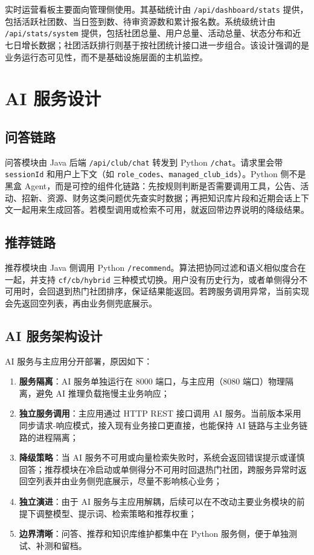 实时运营看板主要面向管理侧使用。其基础统计由 \texttt{/api/dashboard/}\allowbreak\texttt{stats} 提供，包括活跃社团数、当日签到数、待审资源数和累计报名数。系统级统计由 \texttt{/api/stats/}\allowbreak\texttt{system} 提供，包括社团总量、用户总量、活动总量、状态分布和近七日增长数据；社团活跃排行则基于按社团统计接口进一步组合。该设计强调的是业务运行态可见性，而不是基础设施层面的主机监控。

\section{AI 服务设计}

\subsection{问答链路}

问答模块由 Java 后端 \texttt{/api/club/chat} 转发到 Python \texttt{/chat}。请求里会带 \texttt{sessionId} 和用户上下文（如 \texttt{role\_codes}、\texttt{managed\_club\_ids}）。Python 侧不是黑盒 Agent，而是可控的组件化链路：先按规则判断是否需要调用工具，公告、活动、招新、资源、财务这类问题优先查实时数据；再把知识库片段和近期会话上下文一起用来生成回答。若模型调用或检索不可用，就返回带边界说明的降级结果。

\subsection{推荐链路}

推荐模块由 Java 侧调用 Python \texttt{/recommend}。算法把协同过滤和语义相似度合在一起，并支持 \texttt{cf/cb/hybrid} 三种模式切换。用户没有历史行为，或者单侧得分不可用时，会回退到热门社团排序，保证结果能返回。若跨服务调用异常，当前实现会先返回空列表，再由业务侧兜底展示。

\subsection{AI 服务架构设计}

AI 服务与主应用分开部署，原因如下：

\begin{enumerate}
  \item \textbf{服务隔离}：AI 服务单独运行在 8000 端口，与主应用（8080 端口）物理隔离，避免 AI 推理负载拖慢主业务响应；

  \item \textbf{独立服务调用}：主应用通过 HTTP REST 接口调用 AI 服务。当前版本采用同步请求-响应模式，接入现有业务接口更直接，也能保持 AI 链路与主业务链路的进程隔离；

  \item \textbf{降级策略}：当 AI 服务不可用或向量检索失败时，系统会返回错误提示或谨慎回答；推荐模块在冷启动或单侧得分不可用时回退热门社团，跨服务异常时返回空列表并由业务侧兜底展示，尽量不影响核心业务；

  \item \textbf{独立演进}：由于 AI 服务与主应用解耦，后续可以在不改动主要业务模块的前提下调整模型、提示词、检索策略和推荐权重；

  \item \textbf{边界清晰}：问答、推荐和知识库维护都集中在 Python 服务侧，便于单独测试、补测和留档。
\end{enumerate}

